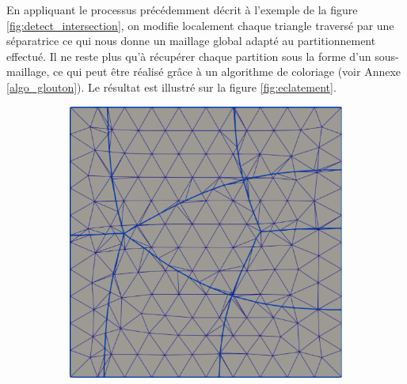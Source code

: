 En appliquant le processus précédemment décrit à l'exemple de la figure \ref{fig:detect_intersection}, on modifie localement chaque triangle traversé par une séparatrice ce qui nous donne un maillage global adapté au partitionnement effectué. Il ne reste plus qu'à récupérer chaque partition sous la forme d'un sous-maillage, ce qui peut être réalisé grâce à un algorithme de coloriage (voir Annexe \ref{algo_glouton}). Le résultat est illustré sur la figure \ref{fig:eclatement}.

\begin{figure}[h!]
\centering
\begin{subfigure}{0.49\textwidth}
    \includegraphics[width=\textwidth]{images/eclatement_2.pdf}
\end{subfigure}
\hfill
\begin{subfigure}{0.49\textwidth}

\end{subfigure}
\end{figure}
